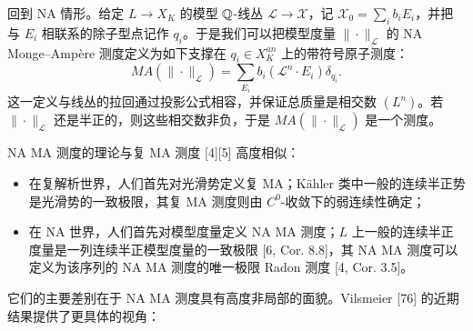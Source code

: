 回到 NA 情形。给定 $L\to X_K$ 的模型 $\mathbb{Q}$-线丛 $\mathcal L\to\mathcal X$，记 $\mathcal X_0=\sum_i b_iE_i$，并把与 $E_i$ 相联系的除子型点记作 $q_i$。于是我们可以把模型度量 $\|\cdot\|_{\mathcal L}$ 的 NA Monge--Ampère 测度定义为如下支撑在 $q_i\in X_K^{an}$ 上的带符号原子测度：
\[
MA(\|\cdot\|_{\mathcal L})=\sum_{E_i}b_i(\mathcal L^n\cdot E_i)\delta_{q_i}.
\]
这一定义与线丛的拉回通过投影公式相容，并保证总质量是相交数 $(L^n)$。若 $\|\cdot\|_{\mathcal L}$ 还是半正的，则这些相交数非负，于是 $MA(\|\cdot\|_{\mathcal L})$ 是一个测度。


NA MA 测度的理论与复 MA 测度 [4][5] 高度相似：
\begin{itemize}
\item 在复解析世界，人们首先对光滑势定义复 MA；Kähler 类中一般的连续半正势是光滑势的一致极限，其复 MA 测度则由 $C^0$-收敛下的弱连续性确定；
\item 在 NA 世界，人们首先对模型度量定义 NA MA 测度；$L$ 上一般的连续半正度量是一列连续半正模型度量的一致极限 [6, Cor. 8.8]，其 NA MA 测度可以定义为该序列的 NA MA 测度的唯一极限 Radon 测度 [4, Cor. 3.5]。
\end{itemize}

它们的主要差别在于 NA MA 测度具有高度非局部的面貌。Vilsmeier [76] 的近期结果提供了更具体的视角：

